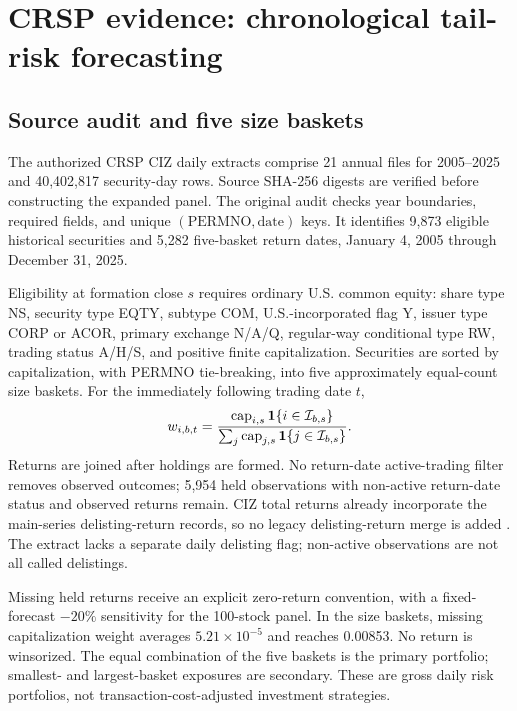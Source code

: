 \documentclass[11pt]{article}
\theoremstyle{definition}\newtheorem{definition}[theorem]{Definition}
\theoremstyle{remark}\newtheorem{remark}[theorem]{Remark}
\begin{document}
\section{CRSP evidence: chronological tail-risk forecasting}\label{sec:crsp}
\subsection{Source audit and five size baskets}
The authorized CRSP CIZ daily extracts comprise 21 annual files for 2005--2025 and 40,402,817 security-day rows. Source SHA-256 digests are verified before constructing the expanded panel. The original audit checks year boundaries, required fields, and unique $(\mathrm{PERMNO},\mathrm{date})$ keys. It identifies 9,873 eligible historical securities and 5,282 five-basket return dates, January 4, 2005 through December 31, 2025.

Eligibility at formation close $s$ requires ordinary U.S. common equity: share type NS, security type EQTY, subtype COM, U.S.-incorporated flag Y, issuer type CORP or ACOR, primary exchange N/A/Q, regular-way conditional type RW, trading status A/H/S, and positive finite capitalization. Securities are sorted by capitalization, with PERMNO tie-breaking, into five approximately equal-count size baskets. For the immediately following trading date $t$,
\begin{equation}\label{eq:crsp-weights}
w_{i,b,t}=\frac{\operatorname{cap}_{i,s}\mathbf 1\{i\in\mathcal I_{b,s}\}}
{\sum_j\operatorname{cap}_{j,s}\mathbf 1\{j\in\mathcal I_{b,s}\}}.
\end{equation}
Returns are joined after holdings are formed. No return-date active-trading filter removes observed outcomes; 5,954 held observations with non-active return-date status and observed returns remain. CIZ total returns already incorporate the main-series delisting-return records, so no legacy delisting-return merge is added \citep{wrds2025ciz,crsp2025guide}. The extract lacks a separate daily delisting flag; non-active observations are not all called delistings.

Missing held returns receive an explicit zero-return convention, with a fixed-forecast $-20\%$ sensitivity for the 100-stock panel. In the size baskets, missing capitalization weight averages $5.21\times10^{-5}$ and reaches 0.00853. No return is winsorized. The equal combination of the five baskets is the primary portfolio; smallest- and largest-basket exposures are secondary. These are gross daily risk portfolios, not transaction-cost-adjusted investment strategies.
\end{document}
